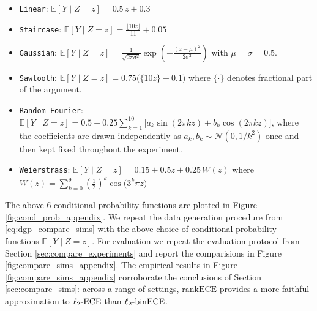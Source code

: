 \documentclass[11pt]{article}
\numberwithin{equation}{section}
\theoremstyle{definition}
\newcommand{\E}{\mathbb{E}}
\newcommand{\ECE}{\mathrm{ECE}}
\newcommand{\lECE}{\ell_2\textnormal{-}\ECE}
\newcommand{\binECE}{\mathrm{binECE}}
\newcommand{\lbinECE}{\ell_2\textnormal{-}\binECE}
\newcommand{\rankECE}{\mathrm{rankECE}}
\begin{document}
\begin{itemize}
    \item \texttt{Linear}: $\E[Y\mid Z = z] = 0.5\,z + 0.3$
    \item \texttt{Staircase}: $\E[Y\mid Z = z] = \frac{\lfloor 10 z \rfloor}{11} + 0.05$
    \item \texttt{Gaussian}: $\E[Y\mid Z = z] = \frac{1}{\sqrt{2\pi\sigma^2}}\exp\!\left(-\frac{(z-\mu)^2}{2\sigma^2}\right)$ with $\mu = \sigma = 0.5$.
    \item \texttt{Sawtooth}: $\E[Y\mid Z = z] = 0.75\big(\{10z\} + 0.1\big)$ where $\{\cdot\}$ denotes fractional part of the argument.
    \item \texttt{Random Fourier}: $\E[Y\mid Z = z] = 0.5 + 0.25\sum_{k=1}^{10}\Big[a_k \sin(2\pi k z) + b_k \cos(2\pi k z)\Big]$, where the coefficients are drawn independently as $a_k, b_k \sim \mathcal{N}(0, 1/k^2)$ once and then kept fixed throughout the experiment.
    \item \texttt{Weierstrass}: $\E[Y\mid Z = z] = 0.15 + 0.5 z + 0.25\, W(z)$ where $W(z) = \sum_{k=0}^{9} \left(\frac{1}{2}\right)^{k} \cos\!\big(3^{k}\pi z\big)$
\end{itemize}
The above $6$ conditional probability functions are plotted in Figure \ref{fig:cond_prob_appendix}. We repeat the data generation procedure from \eqref{eq:dgp_compare_sims} with the above choice of conditional probability functions $\E[Y\mid Z = z]$. For evaluation we repeat the evaluation protocol from Section \ref{sec:compare_experiments} and report the comparisions in Figure \ref{fig:compare_sims_appendix}. The empirical results in Figure \ref{fig:compare_sims_appendix} corroborate the conclusions of Section \ref{sec:compare_sims}: across a range of settings, $\rankECE$ provides a more faithful approximation to $\lECE$ than $\lbinECE$.
\end{document}
